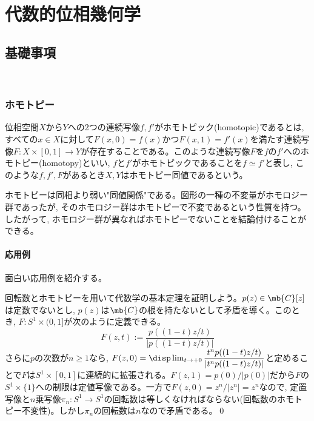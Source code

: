 \chapter{代数的位相幾何学}

\section{基礎事項}　%
\subsection{ホモトピー}
\begin{defn}
位相空間$X$から$Y$への2つの連続写像$f,f'$がホモトピック(homotopic)であるとは, すべての$x\in X$に対して$F(x,0) = f(x)$かつ$F(x,1) = f'(x)$を満たす連続写像$F:X\times[0,1] \to Y$が存在することである。このような連続写像$F$を$f$の$f'$へのホモトピー(homotopy)といい, $f$と$f'$がホモトピックであることを$f\simeq f'$と表し, このような$f,f',F$があるとき$X,Y$はホモトピー同値であるという。
\end{defn}
ホモトピーは同相より弱い"同値関係"である。図形の一種の不変量がホモロジー群であったが, そのホモロジー群はホモトピーで不変であるという性質を持つ。したがって, ホモロジー群が異なればホモトピーでないことを結論付けることができる。


\subsubsection{応用例}
面白い応用例を紹介する。
\begin{eg}
回転数とホモトピーを用いて代数学の基本定理を証明しよう。$p(z)\in \mb{C}[z]$は定数でないとし, $p(z)$は$\mb{C}$の根を持たないとして矛盾を導く。このとき, $F:S^{1}\times (0,1]$が次のように定義できる。
\[F(z,t):= \dfrac{p((1-t)z/t)}{|p((1-t)z/t)|}\]
さらに$p$の次数が$n\geq 1$なら, $F(z,0) = \disp\lim_{t\to +0} \dfrac{t^{n}p((1-t)z/t)}{|t^{n}p((1-t)z/t)|}$と定めることで$F$は$S^{1}\times [0,1]$に連続的に拡張される。$F(z,1) = p(0)/|p(0)|$だから$F$の$S^{1}\times \{ 1 \}$への制限は定値写像である。一方で$F(z,0) = z^{n}/|z^{n}| = z^{n}$なので, 定置写像と$n$乗写像$\pi_n:S^{1}\to S^{1}$の回転数は等しくなければならない(回転数のホモトピー不変性)。しかし$\pi_n$の回転数は$n$なので矛盾である。\qed
\end{eg}

\begin{eg}

\end{eg}

